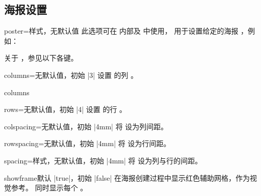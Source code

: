 \clearpage
\subsection{海报设置}\label{subsec:poster_settings}

\begin{postersetTcbKey}[][doc new=2017-07-03]{poster}{=}{样式，无默认值}
  此选项可在  内部及  中使用，
  用于设置给定的海报 ，例如：
\begin{dispListing}
\end{dispListing}
  关于 ，参见以下各键。
\end{postersetTcbKey}


\begin{posterTcbKey}[][doc new=2017-07-03]{columns}{=}{无默认值，初始 |3|}
  设置  的列 。
\begin{exdispExample}{columns}
  \begin{tcbposter}[
    poster = {showframe,columns=5,rows=2,spacing=1mm,height=4cm},
  ]
  \end{tcbposter}
\end{exdispExample}
\end{posterTcbKey}

\begin{posterTcbKey}[][doc new=2017-07-03]{rows}{=}{无默认值，初始 |4|}
  设置  的行 。
\end{posterTcbKey}


\begin{posterTcbKey}[][doc new=2017-07-03]{colspacing}{=}{无默认值，初始 |4mm|}
  将  设为列间距。
\end{posterTcbKey}

\begin{posterTcbKey}[][doc new=2017-07-03]{rowspacing}{=}{无默认值，初始 |4mm|}
  将  设为行间距。
\end{posterTcbKey}

\begin{posterTcbKey}[][doc new=2017-07-03]{spacing}{=}{样式，无默认值，初始 |4mm|}
  将  设为列与行的间距。
\end{posterTcbKey}


\begin{posterTcbKey}[][doc new=2017-07-03]{showframe}{}{默认 |true|，初始 |false|}
  在海报创建过程中显示红色辅助网格，作为视觉参考。
  同时显示每个 。
\end{posterTcbKey}


